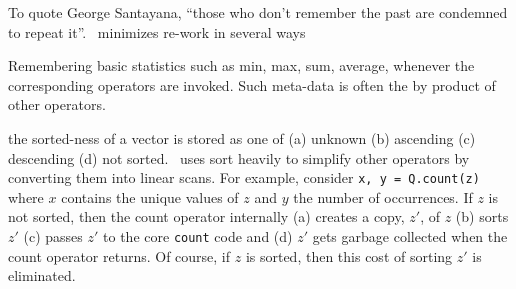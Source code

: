 To quote George Santayana, ``those who don't remember the past are condemned to
repeat it''.  \Q\ minimizes re-work in several ways
\be
\item 
Remembering basic statistics such as min, max, sum, average, whenever the
corresponding operators are invoked. 
Such meta-data is often the by product of other operators.
\item the sorted-ness of a vector is
stored as one of (a) unknown (b) ascending (c) descending (d) not sorted. 
\Q\
uses sort heavily to simplify other operators by converting them into linear
scans. 
For example, consider {\tt x, y  = Q.count(z)} where \(x\) contains the
unique values of \(z\) and \(y\) the number of occurrences. If \(z\) is not
sorted, then the count operator internally (a) creates a copy, \(z'\), of \(z\)
(b) sorts \(z'\) (c) passes \(z'\) to the core {\tt count} code and (d) \(z'\) gets
garbage collected when the count operator returns. Of course, if \(z\) is
sorted, then this cost of sorting \(z'\) is eliminated.

\ee
